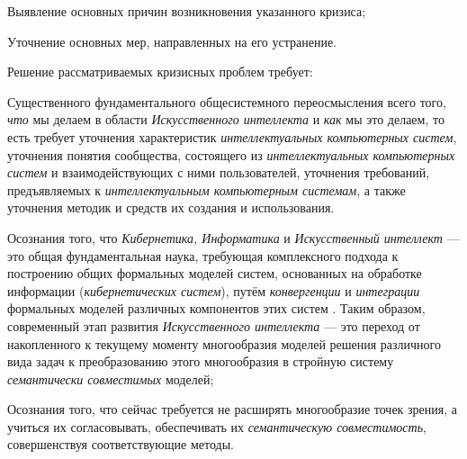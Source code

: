 \begin{textitemize}
	\item
	Выявление основных причин возникновения указанного кризиса;
	\item
	Уточнение основных мер, направленных на его устранение.
\end{textitemize}

Решение рассматриваемых кризисных проблем требует:

\begin{textitemize}
	\item
	Существенного фундаментального общесистемного переосмысления всего того, \textit{что} мы делаем в области \textit{Искусственного интеллекта} и \textit{как} мы это делаем, то есть требует уточнения характеристик \textit{интеллектуальных компьютерных систем}, уточнения понятия сообщества, состоящего из \textit{интеллектуальных компьютерных систем} и взаимодействующих с ними пользователей, уточнения требований, предъявляемых к \textit{интеллектуальным компьютерным системам}, а также уточнения методик и средств их создания и использования.
	\item
	Осознания того, что \textit{Кибернетика, Информатика} и \textit{Искусственный интеллект} --- это общая фундаментальная наука, требующая комплексного подхода к построению общих формальных моделей систем, основанных на обработке информации (\textit{кибернетических систем}), путём \textit{конвергенции} и \textit{интеграции} формальных моделей различных компонентов этих систем . Таким образом, современный этап развития \textit{Искусственного интеллекта} --- это переход от накопленного к текущему моменту многообразия моделей решения различного вида задач к преобразованию этого многообразия в стройную систему \textit{семантически совместимых} моделей;
	\item
	Осознания того, что сейчас требуется не расширять многообразие точек зрения, а учиться их согласовывать, обеспечивать их \textit{семантическую совместимость}, совершенствуя соответствующие методы.
\end{textitemize}

